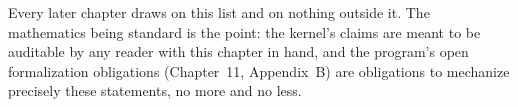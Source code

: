 Every later chapter draws on this list and on nothing outside it. The
mathematics being standard is the point: the kernel's claims are meant to
be auditable by any reader with this chapter in hand, and the program's
open formalization obligations (Chapter~11, Appendix~B) are obligations to
mechanize precisely these statements, no more and no less.
